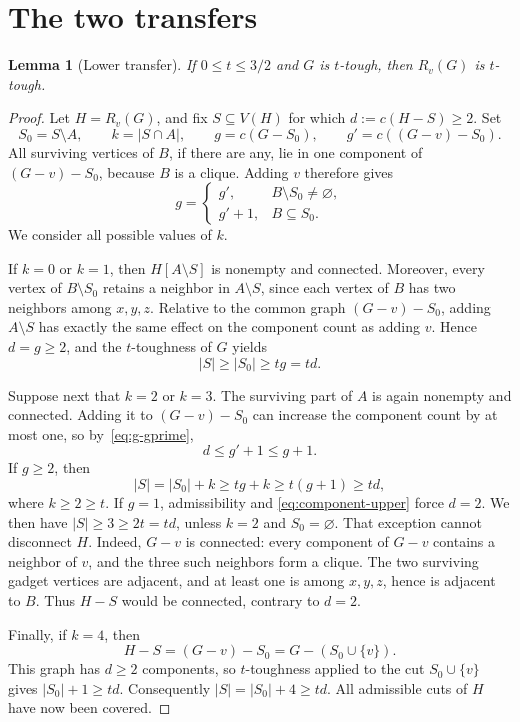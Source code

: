 \documentclass[11pt]{article}
\newtheorem{lemma}[theorem]{Lemma}
\newcommand{\comp}{c}
\begin{document}
\section{The two transfers}

\begin{lemma}[Lower transfer]\label{lem:lower}
If \(0\le t\le3/2\) and \(G\) is \(t\)-tough, then \(R_v(G)\) is
\(t\)-tough.
\end{lemma}

\begin{proof}
Let \(H=R_v(G)\), and fix \(S\subseteq V(H)\) for which
\(d:=\comp(H-S)\ge2\).  Set
\[
 S_0=S\setminus A,\qquad k=|S\cap A|,
 \qquad g=\comp(G-S_0),\qquad
 g'=\comp((G-v)-S_0).
\]
All surviving vertices of \(B\), if there are any, lie in one component of
\((G-v)-S_0\), because \(B\) is a clique.  Adding \(v\) therefore gives
\begin{equation}\label{eq:g-gprime}
 g=\begin{cases}
      g',&B\setminus S_0\ne\varnothing,\\
      g'+1,&B\subseteq S_0.
    \end{cases}
\end{equation}
We consider all possible values of \(k\).

If \(k=0\) or \(k=1\), then \(H[A\setminus S]\) is nonempty and connected.
Moreover, every vertex of \(B\setminus S_0\) retains a neighbor in
\(A\setminus S\), since each vertex of \(B\) has two neighbors among
\(x,y,z\).  Relative to the common graph \((G-v)-S_0\), adding
\(A\setminus S\) has exactly the same effect on the component count as
adding \(v\).  Hence \(d=g\ge2\), and the \(t\)-toughness of \(G\) yields
\[
  |S|\ge |S_0|\ge tg=td.
\]

Suppose next that \(k=2\) or \(k=3\).  The surviving part of \(A\) is again
nonempty and connected.  Adding it to \((G-v)-S_0\) can increase the
component count by at most one, so by~\eqref{eq:g-gprime},
\begin{equation}\label{eq:component-upper}
  d\le g'+1\le g+1.
\end{equation}
If \(g\ge2\), then
\[
 |S|=|S_0|+k\ge tg+k\ge t(g+1)\ge td,
\]
where \(k\ge2\ge t\).  If \(g=1\), admissibility and
\eqref{eq:component-upper} force \(d=2\).  We then have
\(|S|\ge3\ge2t=td\), unless \(k=2\) and \(S_0=\varnothing\).  That exception
cannot disconnect \(H\).  Indeed, \(G-v\) is connected: every component of
\(G-v\) contains a neighbor of \(v\), and the three such neighbors form a
clique.  The two surviving gadget vertices are adjacent, and at least one is
among \(x,y,z\), hence is adjacent to \(B\).  Thus \(H-S\) would be connected,
contrary to \(d=2\).

Finally, if \(k=4\), then
\[
  H-S=(G-v)-S_0=G-(S_0\cup\{v\}).
\]
This graph has \(d\ge2\) components, so \(t\)-toughness applied to the cut
\(S_0\cup\{v\}\) gives \(|S_0|+1\ge td\).  Consequently
\(|S|=|S_0|+4\ge td\).  All admissible cuts of \(H\) have now been covered.
\end{proof}
\end{document}
